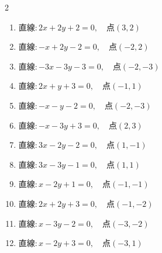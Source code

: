 \begin{multicols}{2}
\begin{enumerate}
  \item $直線:2x+2y+2=0,\quad 点 ( 3, 2 )$


  \item $直線:-x+2y-2=0,\quad 点 ( -2, 2 )$


  \item $直線:-3x-3y-3=0,\quad 点 ( -2, -3 )$


\columnbreak %

  \item $直線:2x+y+3=0,\quad 点 ( -1, 1 )$


  \item $直線:-x-y-2=0,\quad 点 ( -2, -3 )$


  \item $直線:-x-3y+3=0,\quad 点 ( 2, 3 )$


  \item $直線:3x-2y-2=0,\quad 点 ( 1, -1 )$


  \item $直線:3x-3y-1=0,\quad 点 ( 1, 1 )$


  \item $直線:x-2y+1=0,\quad 点 ( -1, -1 )$


  \item $直線:2x+2y+3=0,\quad 点 ( -1, -2 )$


  \item $直線:x-3y-2=0,\quad 点 ( -3, -2 )$


  \item $直線:x-2y+3=0,\quad 点 ( -3, 1 )$


\end{enumerate}
\end{multicols}
